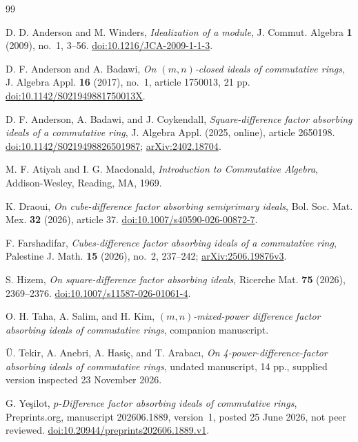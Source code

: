 \documentclass[11pt,a4paper]{amsart}
\theoremstyle{definition}
\theoremstyle{remark}
\numberwithin{equation}{section}
\begin{document}
\begin{thebibliography}{99}

D. D. Anderson and M. Winders,
\emph{Idealization of a module},
J. Commut. Algebra \textbf{1} (2009), no.~1, 3--56.
\href{https://doi.org/10.1216/JCA-2009-1-1-3}{doi:10.1216/JCA-2009-1-1-3}.

D. F. Anderson and A. Badawi,
\emph{On $(m,n)$-closed ideals of commutative rings},
J. Algebra Appl. \textbf{16} (2017), no.~1, article 1750013, 21 pp.
\href{https://doi.org/10.1142/S021949881750013X}{doi:10.1142/S021949881750013X}.

D. F. Anderson, A. Badawi, and J. Coykendall,
\emph{Square-difference factor absorbing ideals of a commutative ring},
J. Algebra Appl. (2025, online), article 2650198.
\href{https://doi.org/10.1142/S0219498826501987}{doi:10.1142/S0219498826501987};
\href{https://arxiv.org/abs/2402.18704}{arXiv:2402.18704}.

M. F. Atiyah and I. G. Macdonald,
\emph{Introduction to Commutative Algebra},
Addison-Wesley, Reading, MA, 1969.

K. Draoui,
\emph{On cube-difference factor absorbing semiprimary ideals},
Bol. Soc. Mat. Mex. \textbf{32} (2026), article 37.
\href{https://doi.org/10.1007/s40590-026-00872-7}{doi:10.1007/s40590-026-00872-7}.

F. Farshadifar,
\emph{Cubes-difference factor absorbing ideals of a commutative ring},
Palestine J. Math. \textbf{15} (2026), no.~2, 237--242;
\href{https://arxiv.org/abs/2506.19876v3}{arXiv:2506.19876v3}.

S. Hizem,
\emph{On square-difference factor absorbing ideals},
Ricerche Mat. \textbf{75} (2026), 2369--2376.
\href{https://doi.org/10.1007/s11587-026-01061-4}{doi:10.1007/\allowbreak{}s11587-026-01061-4}.


O. H. Taha, A. Salim, and H. Kim,
\emph{$(m,n)$-mixed-power difference factor absorbing ideals of commutative
rings}, companion manuscript.

\"U. Tekir, A. Anebri, A. Hasi\c{c}, and T. Arabac{\i},
\emph{On 4-power-difference-factor absorbing ideals of commutative
rings}, undated manuscript, 14 pp., supplied version inspected
23 November 2026.

G. Ye\c{s}ilot,
\emph{$p$-Difference factor absorbing ideals of commutative rings},
Preprints.org, manuscript 202606.1889, version~1, posted 25 June 2026,
not peer reviewed.
\href{https://doi.org/10.20944/preprints202606.1889.v1}{doi:10.20944/preprints202606.1889.v1}.


\end{thebibliography}
\end{document}
